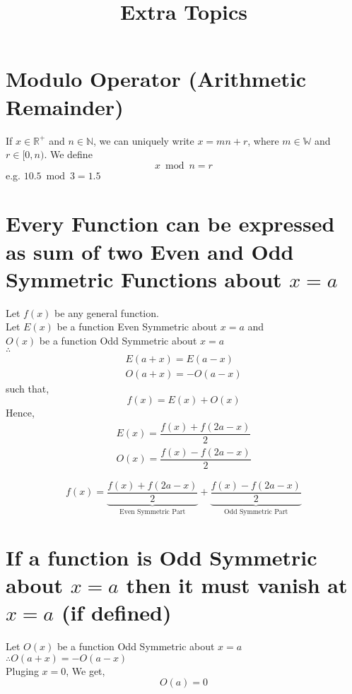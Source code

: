 \documentclass{article}
\title{Extra Topics}
\author{}
\date{}
\begin{document}
\maketitle

\section{Modulo Operator (Arithmetic Remainder)}
If $x \in \mathbb{R}^+$ and $n \in \mathbb{N}$, we can uniquely write $x=mn+r$, where $m \in \mathbb{W}$ and $r \in [0,n)$.
\newline
We define $$x \bmod n=r$$
\newline
e.g. $10.5 \bmod 3=1.5$
\section{Every Function can be expressed as sum of two Even and Odd Symmetric Functions about $x=a$}
Let $f(x)$ be any general function.\\
Let $E(x)$ be a function Even Symmetric about $x=a$ and\\ $O(x)$ be a function Odd Symmetric about $x=a$\\
$\therefore$
\begin{equation*}
    \begin{split}
        E(a+x)=E(a-x)\\
        O(a+x)=-O(a-x)
    \end{split}
\end{equation*}
such that, $$f(x)=E(x)+O(x)$$
Hence,
\begin{equation*}
    \begin{split}
        E(x)=\dfrac{f(x)+f(2a-x)}{2}\\
        O(x)=\dfrac{f(x)-f(2a-x)}{2}
    \end{split}
\end{equation*}

$$f(x)=\underbrace{\dfrac{f(x)+f(2a-x)}{2}}_{\text{Even Symmetric Part}}+\underbrace{\dfrac{f(x)-f(2a-x)}{2} }_{\text{Odd Symmetric Part}}$$
\section{If a function is Odd Symmetric about $x=a$ then it must vanish at $x=a$ (if defined)}
Let $O(x)$ be a function Odd Symmetric about $x=a$\\
$\therefore O(a+x)=-O(a-x)$\\
Pluging $x=0$, We get,
$$\boxed{O(a)=0}$$
\end{document}

